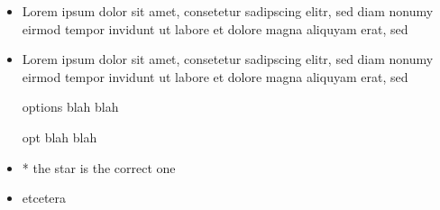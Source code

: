 \documentclass{article}
\begin{document}
\begin{itemize}
  \item Lorem ipsum dolor sit amet, consetetur sadipscing elitr, sed diam
  nonumy eirmod tempor invidunt ut labore et dolore magna aliquyam erat, sed
\item Lorem ipsum dolor sit amet, consetetur sadipscing elitr, sed diam
  nonumy eirmod tempor invidunt ut labore et dolore magna aliquyam erat, sed
\end{itemize}

  \begin{itemize}
    something here

    \item [options] blah blah
      \item[opt] blah blah
    \item * the star is the correct one
    \item etcetera
  \end{itemize}

  
\end{document}
